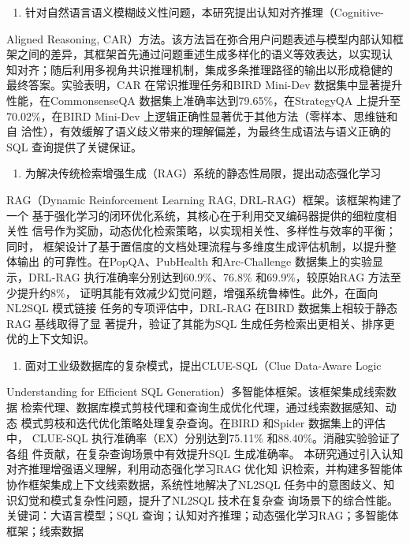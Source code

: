 \documentclass[12pt,a4paper,openright,UTF8]{ctexbook}
\begin{document}
\begin{enumerate}[label=(\arabic*)]
\item 针对自然语言语义模糊歧义性问题，本研究提出认知对齐推理（Cognitive-
\end{enumerate}
Aligned Reasoning, CAR）方法。该方法旨在弥合用户问题表述与模型内部认知框 架之间的差异，其框架首先通过问题重述生成多样化的语义等效表达，以实现认 知对齐；随后利用多视角共识推理机制，集成多条推理路径的输出以形成稳健的 最终答案。实验表明，CAR 在常识推理任务和BIRD Mini-Dev 数据集中显著提升 性能，在CommonsenseQA 数据集上准确率达到79.65\%，在StrategyQA 上提升至 70.02\%，在BIRD Mini-Dev 上逻辑正确性显著优于其他方法（零样本、思维链和自 洽性），有效缓解了语义歧义带来的理解偏差，为最终生成语法与语义正确的SQL 查询提供了关键保证。

\begin{enumerate}[label=(\arabic*)]
\item 为解决传统检索增强生成（RAG）系统的静态性局限，提出动态强化学习
\end{enumerate}
RAG（Dynamic Reinforcement Learning RAG, DRL-RAG）框架。该框架构建了一个 基于强化学习的闭环优化系统，其核心在于利用交叉编码器提供的细粒度相关性 信号作为奖励，动态优化检索策略，以实现相关性、多样性与效率的平衡；同时， 框架设计了基于置信度的文档处理流程与多维度生成评估机制，以提升整体输出 的可靠性。在PopQA、PubHealth 和Arc-Challenge 数据集上的实验显示，DRL-RAG 执行准确率分别达到60.9\%、76.8\% 和69.9\%，较原始RAG 方法至少提升约8\%， 证明其能有效减少幻觉问题，增强系统鲁棒性。此外，在面向NL2SQL 模式链接 任务的专项评估中，DRL-RAG 在BIRD 数据集上相较于静态RAG 基线取得了显 著提升，验证了其能为SQL 生成任务检索出更相关、排序更优的上下文知识。

\begin{enumerate}[label=(\arabic*)]
\item 面对工业级数据库的复杂模式，提出CLUE-SQL（Clue Data-Aware Logic
\end{enumerate}
Understanding for Efficient SQL Generation）多智能体框架。该框架集成线索数据 检索代理、数据库模式剪枝代理和查询生成优化代理，通过线索数据感知、动态 模式剪枝和迭代优化策略处理复杂查询。在BIRD 和Spider 数据集上的评估中， CLUE-SQL 执行准确率（EX）分别达到75.11\% 和88.40\%。消融实验验证了各组 件贡献，在复杂查询场景中有效提升SQL 生成准确率。 本研究通过引入认知对齐推理增强语义理解，利用动态强化学习RAG 优化知 识检索，并构建多智能体协作框架集成上下文线索数据，系统性地解决了NL2SQL 任务中的意图歧义、知识幻觉和模式复杂性问题，提升了NL2SQL 技术在复杂查 询场景下的综合性能。 关键词：大语言模型；SQL 查询；认知对齐推理；动态强化学习RAG；多智能体 框架；线索数据
\end{document}
